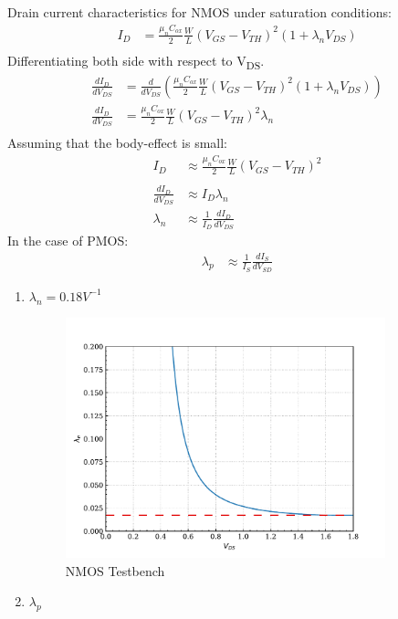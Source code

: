 \documentclass{article}
\begin{document}
\begin{enumerate}
Drain current characteristics for NMOS under saturation conditions:
\begin{equation*}
\begin{aligned}
I_{D} &= \frac{\mu_{n}C_{ox}}{2} \frac{W}{L} (V_{GS} - V_{TH})^2(1 + \lambda_{n}V_{DS}) \\
\end{aligned}
\end{equation*}
Differentiating both side with respect to V\textsubscript{DS}.
\begin{equation*}
\begin{aligned}
\frac{dI_{D}}{dV_{DS}} &= \frac{d}{dV_{DS}} (\frac{\mu_{n}C_{ox}}{2} \frac{W}{L} (V_{GS} - V_{TH})^2(1 + \lambda_{n} V_{DS})) \\
\frac{dI_{D}}{dV_{DS}} &= \frac{\mu_{n}C_{ox}}{2} \frac{W}{L} (V_{GS} - V_{TH})^2 \lambda_{n} \\
\end{aligned}
\end{equation*}
Assuming that the body-effect is small:
\begin{equation*}
\begin{aligned}
I_{D} &\approx \frac{\mu_{n}C_{ox}}{2} \frac{W}{L} (V_{GS} - V_{TH})^2 \\
\\
\frac{dI_{D}}{dV_{DS}} &\approx I_{D} \lambda_{n} \\
\lambda_{n} &\approx \frac{1}{I_{D}} \frac{dI_{D}}{dV_{DS}}
\end{aligned}
\end{equation*}
In the case of PMOS:
\begin{equation*}
\begin{aligned}
\lambda_{p} &\approx \frac{1}{I_{S}} \frac{dI_{S}}{dV_{SD}}
\end{aligned}
\end{equation*}

\begin{enumerate}
\item \(\lambda_{n} = 0.18 V^{-1}\)
\begin{figure}[H]
\centering
\includegraphics[width=350px]{img/q4/b/nmos-d-id-id.pdf}
\caption{\label{fig:nmos-testbench-2}NMOS Testbench}
\end{figure}

\item \(\lambda_{p}\)
\end{enumerate}
\end{enumerate}
\end{document}

